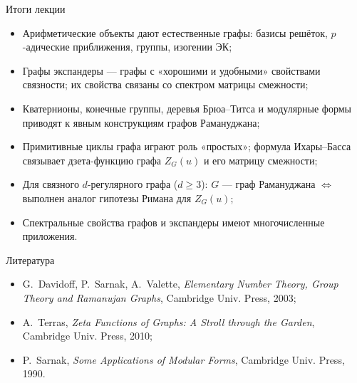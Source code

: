 \documentclass[serif, aspectratio=169]{beamer}
\begin{document}
\begin{frame}{Итоги лекции}
    \begin{itemize}
        \item Арифметические объекты дают естественные графы: базисы решёток, $p$-адические приближения, группы, изогении ЭК;
        \item Графы экспандеры --- графы с «хорошими и удобными» свойствами связности; их свойства связаны со спектром матрицы смежности;
        \item Кватернионы, конечные группы, деревья Брюа--Титса и модулярные формы приводят к явным конструкциям графов Рамануджана;
        \item Примитивные циклы графа играют роль «простых»; формула Ихары--Басса связывает дзета-функцию графа $Z_G(u)$ и его матрицу смежности;
        \item Для связного $d$-регулярного графа ($d\ge3$): $G$ --- граф Рамануджана $\Leftrightarrow$ выполнен аналог гипотезы Римана для $Z_G(u)$;
        \item Спектральные свойства графов и экспандеры имеют многочисленные приложения.
    \end{itemize}
    \note{
        \begin{itemize}
            \item ---
        \end{itemize}
    }
\end{frame}

\begin{frame}{Литература}
    \begin{itemize}[<.->]
        \item G.~Davidoff, P.~Sarnak, A.~Valette, \textit{Elementary Number Theory, Group Theory and Ramanujan Graphs}, Cambridge Univ. Press, 2003;
        \item A.~Terras, \textit{Zeta Functions of Graphs: A Stroll through the Garden}, Cambridge Univ. Press, 2010;
        \item P.~Sarnak, \textit{Some Applications of Modular Forms}, Cambridge Univ. Press, 1990.
    \end{itemize}
    \note{
        \begin{itemize}
            \item ---
        \end{itemize}
    }
\end{frame}
\end{document}
